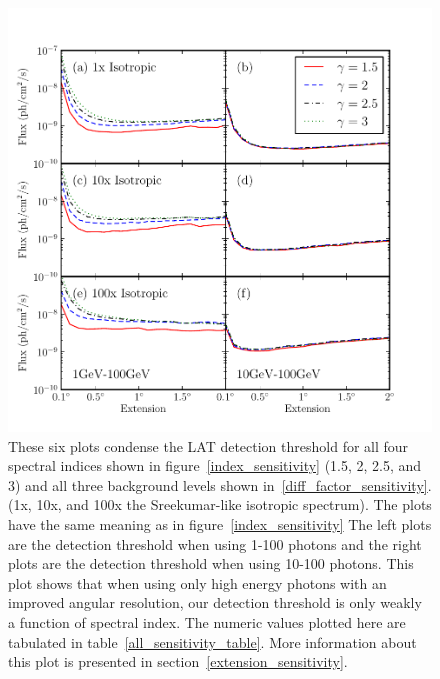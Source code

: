 \documentclass[12pt,preprint]{aastex}
\newcommand{\gev}{\text{GeV}\xspace}
\begin{document}
  \clearpage
\begin{appendices}

\begin{figure}
  \begin{center}
    \includegraphics{mc_plots/all_sensitivity.pdf}
    \end{center}
    \caption{These six plots condense the LAT detection threshold for
    all four spectral indices shown in figure~\ref{index_sensitivity}
    (1.5, 2, 2.5, and 3) and all three background levels shown
    in~\ref{diff_factor_sensitivity}.  (1x, 10x, and 100x the
    Sreekumar-like isotropic spectrum).  The plots have the same meaning
    as in figure~\ref{index_sensitivity} The left plots are the detection
    threshold when using 1-100 \gev photons and the right plots are the detection threshold when using
    10-100 \gev photons.  This plot shows
    that when using only high energy photons with an improved angular
    resolution, our detection threshold is only weakly a function of
    spectral index. The numeric values plotted here are tabulated
    in table~\ref{all_sensitivity_table}. More information about this plot is presented
    in section~\ref{extension_sensitivity}.
    }\label{all_sensitivity} 
  \end{figure}


\end{appendices}
\end{document}
